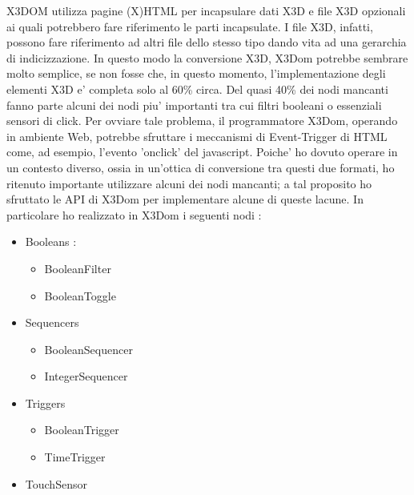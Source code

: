 \documentclass[11pt]{article}
\begin{document}
\begin{flushleft}
X3DOM utilizza pagine (X)HTML per incapsulare dati X3D e file X3D opzionali ai quali potrebbero fare riferimento le parti incapsulate. I file X3D, infatti, possono fare riferimento ad altri file dello stesso tipo dando vita ad una gerarchia di indicizzazione. 
In questo modo la conversione X3D, X3Dom potrebbe sembrare molto semplice, se non fosse che, in questo momento, l'implementazione degli elementi X3D e' completa solo al 
60\% circa. 
Del quasi 40\% dei nodi mancanti fanno parte alcuni dei nodi piu' importanti tra cui filtri booleani o essenziali sensori di click. 
Per ovviare tale problema, il programmatore X3Dom, operando in ambiente Web, potrebbe sfruttare i meccanismi di Event-Trigger di HTML come, ad esempio, l'evento 'onclick' del javascript. 
\newline
Poiche' ho dovuto operare in un contesto diverso, ossia in un'ottica di conversione tra questi due formati, ho ritenuto importante utilizzare alcuni dei nodi mancanti; a tal proposito ho sfruttato le API di X3Dom per implementare alcune di queste lacune. 
\newline 
In particolare ho realizzato in X3Dom i seguenti nodi : 
    \begin{itemize}
        \item Booleans :
            \begin{itemize}
                \item BooleanFilter
                \item BooleanToggle
            \end{itemize}
        \item Sequencers
            \begin{itemize}
                \item BooleanSequencer
                \item IntegerSequencer 
            \end{itemize}
        \item Triggers
            \begin{itemize}
                \item BooleanTrigger
                \item TimeTrigger
            \end{itemize}
        \item TouchSensor
    \end{itemize}
\end{flushleft}
\end{document}
